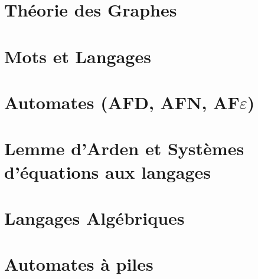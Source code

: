 



\chapter{Théorie des Graphes}


\chapter{Mots et Langages}


\chapter{Automates (AFD, AFN, AF$\varepsilon$)}


\chapter{Lemme d'Arden et Systèmes d'équations aux langages}


\chapter{Langages Algébriques}


\chapter{Automates à piles}






